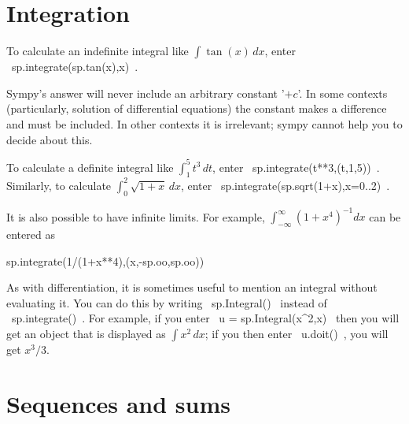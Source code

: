 \documentclass[a4paper,10pt]{amsbook}
\begin{document}
\section{Integration}\label{sec-int}


\begin{secenum}
%
 \item\label{int} To calculate an indefinite integral like
  $\int\tan(x)\,dx$, enter \pcode~sp.integrate(sp.tan(x),x)~. 
%
 \item\label{intconst} Sympy's answer will never include an arbitrary
  constant '$+c$'.  In some contexts (particularly, solution
  of differential equations) the constant makes a
  difference and must be included.  In other contexts it
  is irrelevant; sympy cannot help you to decide about
  this. 
%
 \item\label{defint} To calculate a definite integral like
  $\int_1^5t^3\,dt$, enter \pcode~sp.integrate(t**3,(t,1,5))~. 
  Similarly, to calculate $\int_0^2\sqrt{1+x}\,dx$, enter
  \pcode~sp.integrate(sp.sqrt(1+x),x=0..2)~. 
%
 \item\label{improper} It is also possible to have infinite limits.  For
  example, $\int_{-\infty}^\infty (1+x^4)^{-1}dx$ can be 
  entered as 
  \begin{pcodeblock}
   sp.integrate(1/(1+x**4),(x,-sp.oo,sp.oo))
  \end{pcodeblock}
%
 \item\label{inertint} As with differentiation, it is sometimes useful to
  mention an integral without evaluating it.  You can do
  this by writing \pcode~sp.Integral()~ instead of
  \pcode~sp.integrate()~.  For example, if you enter
  \pcode~u = sp.Integral(x^2,x)~ then you will get an object that is
  displayed as $\int x^2\,dx$; if you then enter
  \pcode~u.doit()~, you will get $x^3/3$. 
\end{secenum}

\section{Sequences and sums}
\end{document}
